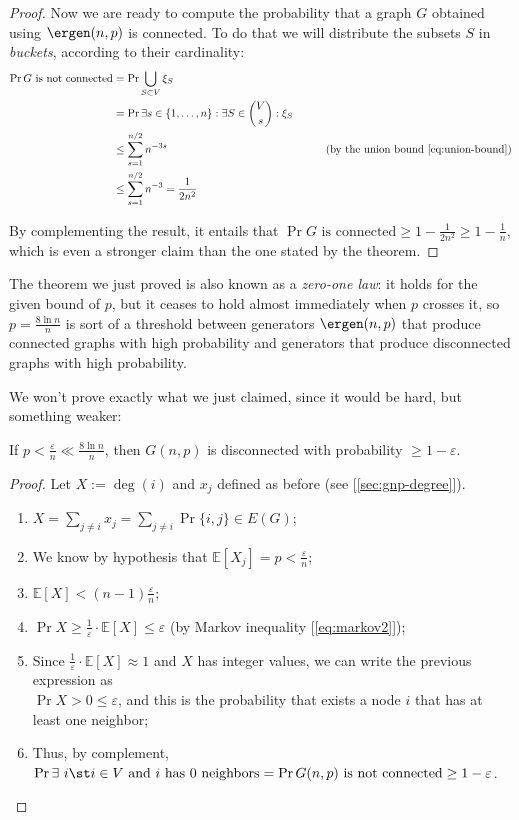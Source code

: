 \begin{proof}
    Now we are ready to compute the probability that a graph $G$ obtained using $\ergen(n, p)$ is connected. To do that we will distribute the subsets $S$ in \emph{buckets}, according to their cardinality:
    \begin{align*}
        \Pr{G \text{ is not connected}} &= \Pr{\bigcup_{S \subset V} \xi_S}         & \\
        &= \Pr{\exists s \in \{1, \ldots, n\} : \exists S \in \binom{V}{s} : \xi_S} & \\
        &\leq \sum_{s = 1}^{n/2} n^{-3s}                                            & \tag{by the union bound \ref{eq:union-bound}}\\
        &\leq \sum_{s = 1}^{n/2} n^{-3} = \frac{1}{2n^2}                            &
    \end{align*}
    
   By complementing the result, it entails that $\Pr{G \text{ is connected}} \geq 1 - \frac{1}{2n^2} \geq 1 - \frac{1}{n}$, which is even a stronger claim than the one stated by the theorem.
\end{proof}

The theorem we just proved is also known as a \emph{zero-one law}: it holds for the given bound of $p$, but it ceases to hold almost immediately when $p$ crosses it, so $p = \frac{8 \ln n}{n}$ is sort of a threshold between generators $\ergen(n, p)$ that produce connected graphs with high probability and generators that produce disconnected graphs with high probability.

We won't prove exactly what we just claimed, since it would be hard, but something weaker:
\begin{thm}
    If $p < \frac{\varepsilon}{n} \ll \frac{8 \ln n}{n}$, then $G(n, p)$ is disconnected with probability $\geq 1 - \varepsilon$.
\end{thm}

\begin{proof}
    Let $X := \deg(i)$ and $x_j$ defined as before (see [\ref{sec:gnp-degree}]).
    \begin{enumerate}
        \item $X = \sum_{j \neq i} x_j = \sum_{j \neq i} \Pr{\{ i,j \} \in E(G)}$;
        \item We know by hypothesis that $\mathbb{E}[X_j] = p < \frac{\varepsilon}{n}$;
        \item $\mathbb{E}[X] < (n-1) \frac{\varepsilon}{n}$;
        \item $\Pr{X \geq \frac{1}{\varepsilon} \cdot \mathbb{E}[X]} \leq \varepsilon$ (by Markov inequality [\ref{eq:markov2}]);
        \item Since $\frac{1}{\varepsilon} \cdot \mathbb{E}[X] \approx 1$ and $X$ has integer values, we can write the previous expression as \\
        $\Pr{X > 0} \leq \varepsilon$, and this is the probability that exists a node $i$ that has at least one neighbor;
        \item Thus, by complement, $\Pr{\exists\ i \st i \in V \text{ and } i \text{ has 0 neighbors}} = \Pr{G(n,p) \text{ is not connected}} \geq 1 - \varepsilon$.
    \end{enumerate}
\end{proof}
    

